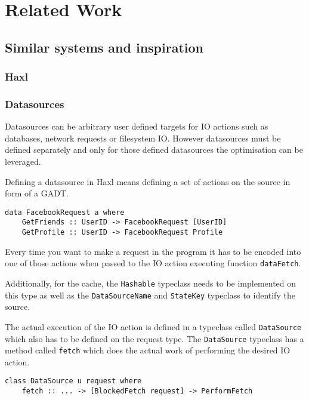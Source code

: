 \chapter{Related Work}

\label{ch:related-work}

\section{Similar systems and inspiration}

\subsection{Haxl}

\subsection{Datasources}

Datasources can be arbitrary user defined targets for IO actions such as databases, network requests or filesystem IO.
However datasources must be defined separately and only for those defined datasources the optimisation can be leveraged.

Defining a datasource in Haxl means defining a set of actions on the source in form of a GADT.

\begin{verbatim}
data FacebookRequest a where
    GetFriends :: UserID -> FacebookRequest [UserID]
    GetProfile :: UserID -> FacebookRequest Profile
\end{verbatim}

Every time you want to make a request in the program it has to be encoded into one of those actions when passed to the IO action executing function \texttt{dataFetch}.

Additionally, for the cache, the \texttt{Hashable} typeclass needs to be implemented on this type as well as the \texttt{DataSourceName} and \texttt{StateKey} typeclass to identify the source.

The actual execution of the IO action is defined in a typeclass called \texttt{DataSource} which also has to be defined on the request type.
The \texttt{DataSource} typeclass has a method called \texttt{fetch} which does the actual work of performing the desired IO action.

\begin{verbatim}
class DataSource u request where
    fetch :: ... -> [BlockedFetch request] -> PerformFetch
\end{verbatim}

